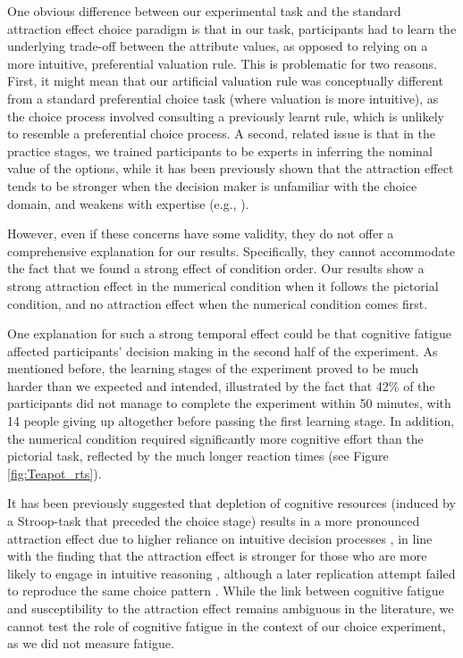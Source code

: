\documentclass[11pt,a4paper]{article}
\begin{document}
One obvious difference between our experimental task and the standard attraction effect choice paradigm is that in our task, participants had to learn the underlying trade-off between the attribute values, as opposed to relying on a more intuitive, preferential valuation rule. This is problematic for two reasons. First, it might mean that our artificial valuation rule was conceptually different from a standard preferential choice task (where valuation is more intuitive), as the choice process involved consulting a previously learnt rule, which is unlikely to resemble a preferential choice process. A second, related issue is that in the practice stages, we trained participants to be experts in inferring the nominal value of the options, while it has been previously shown that the attraction effect tends to be stronger when the decision maker is unfamiliar with the choice domain, and weakens with expertise (e.g., ). 

However, even if these concerns have some validity, they do not offer a comprehensive explanation for our results. Specifically, they cannot accommodate the fact that we found a strong effect of condition order. Our results show a strong attraction effect in the numerical condition when it follows the pictorial condition, and no attraction effect when the numerical condition comes first. 

One explanation for such a strong temporal effect could be that cognitive fatigue affected participants' decision making in the second half of the experiment. As mentioned before, the learning stages of the experiment proved to be much harder than we expected and intended, illustrated by the fact that 42\% of the participants did not manage to complete the experiment within 50 minutes, with 14 people giving up altogether before passing the first learning stage. In addition, the numerical condition required significantly more cognitive effort than the pictorial task, reflected by the much longer reaction times (see Figure \ref{fig:Teapot_rts}). 

It has been previously suggested that depletion of cognitive resources (induced by a Stroop-task that preceded the choice stage) results in a more pronounced attraction effect due to higher reliance on intuitive decision processes \cite{Pocheptsova2009a}, in line with the finding that the attraction effect is stronger for those who are more likely to engage in intuitive reasoning \cite{Mao2012}, although a later replication attempt failed to reproduce the same choice pattern \cite{DeHaan2015}.  
While the link between cognitive fatigue and susceptibility to the attraction effect remains ambiguous in the literature, we cannot test the role of cognitive fatigue in the context of our choice experiment, as we did not measure fatigue.
\end{document}

